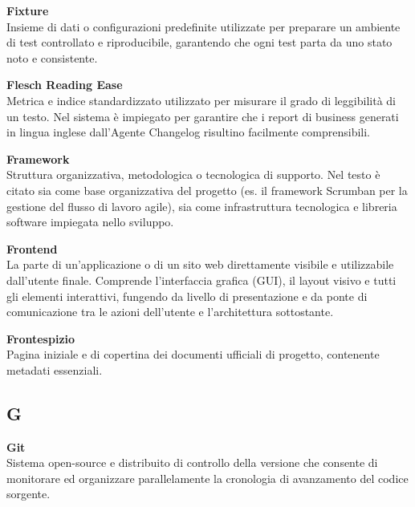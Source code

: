 \documentclass[12pt, a4paper]{article}
\begin{document}
\noindent\hypertarget{fixture}{\textbf{Fixture}} \\[0.1em]
Insieme di dati o configurazioni predefinite utilizzate per preparare un ambiente di test controllato e riproducibile, garantendo che ogni test parta da uno stato noto e consistente.
\vspace{0.5cm}

\noindent\hypertarget{flesch-reading-ease}{\textbf{Flesch Reading Ease}} \\[0.1em]
Metrica e indice standardizzato utilizzato per misurare il grado di leggibilità di un testo. Nel sistema è impiegato per garantire che i report di business generati in lingua inglese dall'Agente Changelog risultino facilmente comprensibili.
\vspace{0.5cm}  

\noindent\hypertarget{framework}{\textbf{Framework}} \\[0.1em]
Struttura organizzativa, metodologica o tecnologica di supporto. Nel testo è citato sia come base organizzativa del progetto (es. il framework Scrumban per la gestione del flusso di lavoro agile), sia come infrastruttura tecnologica e libreria software impiegata nello sviluppo.
\vspace{0.5cm}  

\noindent\hypertarget{frontend}{\textbf{Frontend}} \\[0.1em]
La parte di un'applicazione o di un sito web direttamente visibile e utilizzabile dall'utente finale. Comprende l'interfaccia grafica (GUI), il layout visivo e tutti gli elementi interattivi, fungendo da livello di presentazione e da ponte di comunicazione tra le azioni dell'utente e l'architettura sottostante.
\vspace{0.5cm}

\noindent\hypertarget{frontespizio}{\textbf{Frontespizio}} \\[0.1em]
Pagina iniziale e di copertina dei documenti ufficiali di progetto, contenente metadati essenziali.
\vspace{0.1cm}
\newpage

\subsection*{G}
{}
\vspace{0.2cm}

\noindent\hypertarget{git}{\textbf{Git}} \\[0.1em]
Sistema open-source e distribuito di controllo della versione che consente di monitorare ed organizzare parallelamente la cronologia di avanzamento del codice sorgente.
\vspace{0.5cm}
\end{document}

